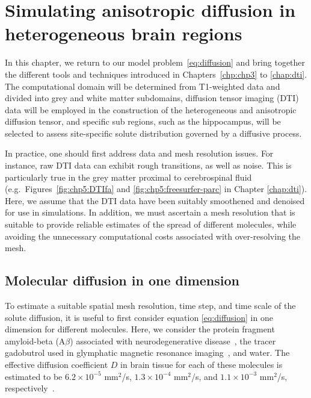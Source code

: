 \chapter{Simulating anisotropic diffusion in heterogeneous brain regions}
\label{chp:chp6}

In this chapter, we return to our model problem~\eqref{eq:diffusion}
and bring together the different tools and techniques introduced in
Chapters~\ref{chp:chp3} to \ref{chap:dti}. The computational domain
will be determined from T1-weighted data and divided into grey and
white matter subdomains, diffusion tensor imaging (DTI) data will be
employed in the construction of the heterogeneous and anisotropic
diffusion tensor, and specific sub regions, such as the hippocampus,
will be selected to assess site-specific solute distribution governed
by a diffusive process.

In practice, one should first address data and mesh resolution
issues. For instance, raw DTI data can exhibit rough transitions, as
well as noise. This is particularly true in the grey matter proximal
to cerebrospinal fluid (e.g.~Figures~\ref{fig:chp5:DTIfa} and
\ref{fig:chp5:freesurfer-parc} in Chapter \ref{chap:dti}). Here, we assume that 
the DTI data have been suitably smoothened and denoised for use in simulations. In
addition, we must ascertain a mesh resolution that is suitable to
provide reliable estimates of the spread  of different
molecules, while avoiding the unnecessary computational costs
associated with over-resolving the mesh.

\section{Molecular diffusion in one dimension}
\label{sec:chp6:1D-tests}

To estimate a suitable spatial mesh resolution, time step, and time scale of the solute diffusion, it is useful to
first consider equation \eqref{eq:diffusion} in one dimension for different
molecules. Here, we consider the protein fragment amyloid-beta
(A$\beta$) associated with neurodegenerative
disease~\cite{iliff2012paravascular}, the tracer gadobutrol used in
glymphatic magnetic resonance imaging~\cite{ringstad2018brain}, and water. The
effective diffusion coefficient $D$ in brain tissue for each of these
molecules is estimated to be $6.2 \times 10^{-5}$ mm$^2$/s,
$1.3 \times 10^{-4}$ mm$^2$/s, and $1.1 \times 10^{-3}$ mm$^2$/s,
respectively~\cite{waters2010concentration,valnes2020apparent}.

